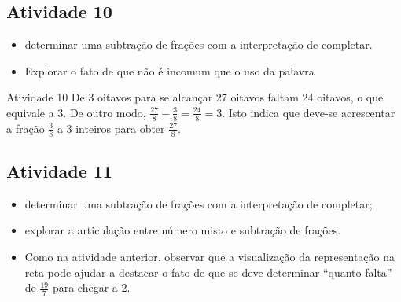 \begin{multicols}{2}

\subsection{Atividade 10}

\newline \vspace{.15cm}

\begin{itemize} %
  \item     determinar uma subtração de frações com a interpretação de completar.
\end{itemize} %


 \vspace{.15cm}

\begin{itemize} %
  \item     Explorar o fato de que não é incomum que o uso da palavra 
\end{itemize} %

\begin{resposta*}{Atividade 10}
De 3 oitavos para se alcançar 27 oitavos faltam 24 oitavos, o que equivale a 3. De outro modo, $\frac{27}{8} - \frac{3}{8} = \frac{24}{8} = 3$. Isto indica que deve-se acrescentar a fração $\frac{3}{8}$ a 3 inteiros para obter $\frac{27}{8}$. 
\end{resposta*}

\subsection{Atividade 11}

  \newline \vspace{.15cm}  
\begin{itemize} %
    \item       determinar uma subtração de frações com a interpretação de completar;
    \item       explorar a articulação entre número misto e subtração de frações.
\end{itemize} %
  
 \vspace{.15cm}  
\begin{itemize} %
    \item       Como na atividade anterior, observar que a visualização da representação na reta pode ajudar a destacar o fato de que se deve determinar       ``quanto falta''       de       $\frac{19}{7}$       para chegar a 2.
\end{itemize} %


\end{multicols}
